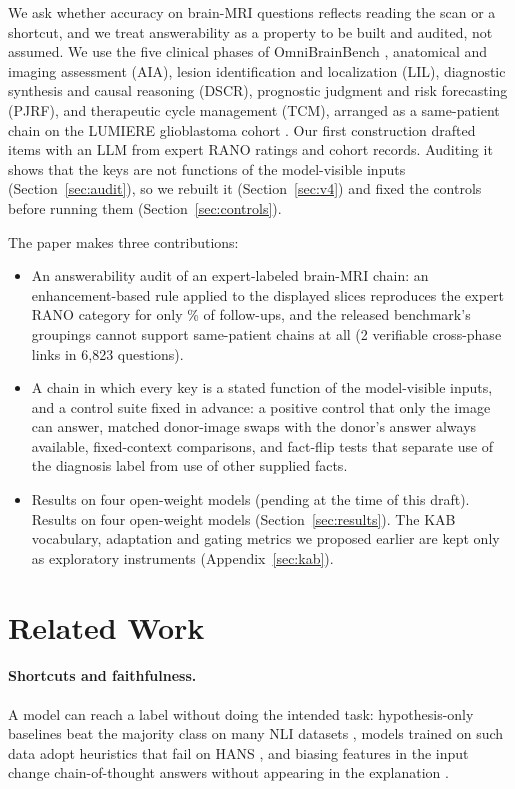 We ask whether accuracy on brain-MRI questions reflects reading the scan or a shortcut, and we treat answerability as a property to be built and audited, not assumed. We use the five clinical phases of OmniBrainBench \citep{peng2026omnibrainbench}, anatomical and imaging assessment (AIA), lesion identification and localization (LIL), diagnostic synthesis and causal reasoning (DSCR), prognostic judgment and risk forecasting (PJRF), and therapeutic cycle management (TCM), arranged as a same-patient chain on the LUMIERE glioblastoma cohort \citep{suter2022lumiere}. Our first construction drafted items with an LLM from expert RANO ratings and cohort records. Auditing it shows that the keys are not functions of the model-visible inputs (Section~\ref{sec:audit}), so we rebuilt it (Section~\ref{sec:v4}) and fixed the controls before running them (Section~\ref{sec:controls}).

The paper makes three contributions:
\begin{itemize}[leftmargin=*, itemsep=2pt, topsep=2pt]
    \item An answerability audit of an expert-labeled brain-MRI chain: an enhancement-based rule applied to the displayed slices reproduces the expert RANO category for only \vfourConcordantPct{}\% of \vfourFollowups{} follow-ups, and the released benchmark's groupings cannot support same-patient chains at all (2 verifiable cross-phase links in 6,823 questions).
    \item A chain in which every key is a stated function of the model-visible inputs, and a control suite fixed in advance: a positive control that only the image can answer, matched donor-image swaps with the donor's answer always available, fixed-context comparisons, and fact-flip tests that separate use of the diagnosis label from use of other supplied facts.
    \item \ifnum{} Results on four open-weight models (pending at the time of this draft). \else Results on four open-weight models (Section~\ref{sec:results}). \fi The KAB vocabulary, adaptation and gating metrics we proposed earlier are kept only as exploratory instruments (Appendix~\ref{sec:kab}).
\end{itemize}

\section{Related Work}
\label{sec:related-work}

\paragraph{Shortcuts and faithfulness.} A model can reach a label without doing the intended task: hypothesis-only baselines beat the majority class on many NLI datasets \citep{poliak2018hypothesis, gururangan2018annotation}, models trained on such data adopt heuristics that fail on HANS \citep{mccoy2019right}, and biasing features in the input change chain-of-thought answers without appearing in the explanation \citep{turpin2023language}.

